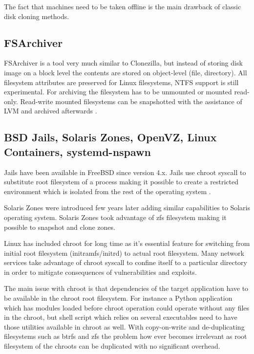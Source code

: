 \documentclass[a4paper,11pt]{kth-mag}
\begin{document}
The fact that machines need to be taken offline is the main
drawback of classic disk cloning methods.

\subsection{FSArchiver}

FSArchiver
is a tool very much similar to Clonezilla,
but instead of storing disk image on a block level the
contents are stored on object-level (file, directory).
All filesystem attributes are preserved for Linux filesystems,
NTFS support is still experimental.
For archiving the filesystem has to be unmounted or mounted
read-only. Read-write mounted filesystems can be snapshotted 
with the assistance of LVM and archived afterwards
\cite{fsarchiver}.


\subsection{BSD Jails, Solaris Zones, OpenVZ, Linux Containers, systemd-nspawn}

Jails have been available in FreeBSD since version 4.x. Jails use chroot
syscall to substitute root filesystem of a process making it possible to
create a restricted environment which is isolated from the rest of the
operating system
\cite{jail}.

Solaris Zones were introduced few years later adding similar
capabilities to Solaris operating system.
Solaris Zones took advantage of \acrshort{zfs} filesystem making it
possible to snapshot and clone zones.

Linux has included chroot for long time as it's essential feature for switching from initial root filesystem (initramfs/initrd) to actual root filesystem.
Many network services take advantage of chroot syscall to confine
itself to a particular directory in order to mitigate consequences
of vulnerabilities and exploits.

The main issue with chroot is that dependencies of the target
application have to be available in the chroot root filesystem.
For instance a Python application which has modules loaded before
chroot operation could operate without any files in the chroot,
but shell script which relies on several executables need to have
those utilities available in chroot as well.
With copy-on-write and de-duplicating filesystems such as
\acrshort{btrfs} and
\acrshort{zfs} the problem how ever becomes irrelevant as root
filesystem of the chroots can be duplicated with no significant overhead.
\end{document}
